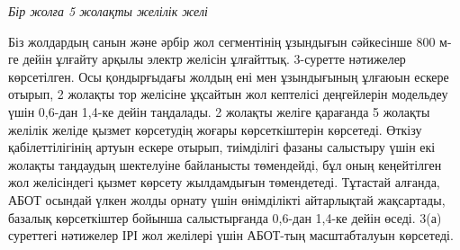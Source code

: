 \begin{multicols}{2}


\emph{Бір жолға 5 жолақты желілік желі}

Біз жолдардың санын және әрбір жол сегментінің ұзындығын сәйкесінше 800
м-ге дейін ұлғайту арқылы электр желісін ұлғайттық. 3-суретте нәтижелер
көрсетілген. Осы қондырғыдағы жолдың ені мен ұзындығының ұлғаюын ескере
отырып, 2 жолақты тор желісіне ұқсайтын жол кептелісі деңгейлерін
модельдеу үшін 0,6-дан 1,4-ке дейін таңдалады. 2 жолақты желіге
қарағанда 5 жолақты желілік желіде қызмет көрсетудің жоғары
көрсеткіштерін көрсетеді. Өткізу қабілеттілігінің артуын ескере отырып,
тиімділігі фазаны салыстыру үшін екі жолақты таңдаудың шектелуіне
байланысты төмендейді, бұл оның кеңейтілген жол желісіндегі қызмет
көрсету жылдамдығын төмендетеді. Тұтастай алғанда, АБОТ осындай үлкен
жолды орнату үшін өнімділікті айтарлықтай жақсартады, базалық
көрсеткіштер бойынша салыстырғанда 0,6-дан 1,4-ке дейін өседі. 3(а)
суреттегі нәтижелер ІРІ жол желілері үшін АБОТ-тың масштабталуын
көрсетеді.
\end{multicols}

